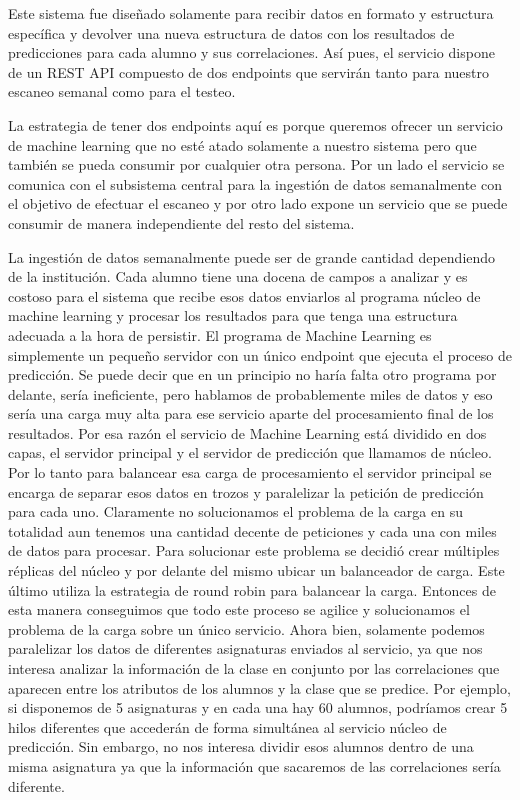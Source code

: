 Este sistema fue diseñado solamente para recibir datos en formato y
estructura específica y devolver una nueva estructura de datos con los
resultados de predicciones para cada alumno y sus correlaciones. Así
pues, el servicio dispone de un REST API compuesto de dos endpoints
que servirán tanto para nuestro escaneo semanal como para el testeo.

La estrategia de tener dos endpoints aquí es porque queremos ofrecer
un servicio de machine learning que no esté atado solamente a nuestro
sistema pero que también se pueda consumir por cualquier otra
persona. Por un lado el servicio se comunica con el subsistema central
para la ingestión de datos semanalmente con el objetivo de efectuar el
escaneo y por otro lado expone un servicio que se puede consumir de
manera independiente del resto del sistema.

La ingestión de datos semanalmente puede ser de grande cantidad
dependiendo de la institución. Cada alumno tiene una docena de campos
a analizar y es costoso para el sistema que recibe esos datos
enviarlos al programa núcleo de machine learning y procesar los
resultados para que tenga una estructura adecuada a la hora de
persistir. El programa de Machine Learning es simplemente un pequeño
servidor con un único endpoint que ejecuta el proceso de
predicción. Se puede decir que en un principio no haría falta otro
programa por delante, sería ineficiente, pero hablamos de
probablemente miles de datos y eso sería una carga muy alta para ese
servicio aparte del procesamiento final de los resultados. Por esa
razón el servicio de Machine Learning está dividido en dos capas, el
servidor principal y el servidor de predicción que llamamos de
núcleo. Por lo tanto para balancear esa carga de procesamiento el
servidor principal se encarga de separar esos datos en trozos y
paralelizar la petición de predicción para cada uno. Claramente no
solucionamos el problema de la carga en su totalidad aun tenemos una
cantidad decente de peticiones y cada una con miles de datos para
procesar. Para solucionar este problema se decidió crear múltiples
réplicas del núcleo y por delante del mismo ubicar un balanceador de
carga. Este último utiliza la estrategia de round robin para balancear
la carga. Entonces de esta manera conseguimos que todo este proceso se
agilice y solucionamos el problema de la carga sobre un único
servicio.  Ahora bien, solamente podemos paralelizar los datos de
diferentes asignaturas enviados al servicio, ya que nos interesa
analizar la información de la clase en conjunto por las correlaciones
que aparecen entre los atributos de los alumnos y la clase que se
predice. Por ejemplo, si disponemos de 5 asignaturas y en cada una hay
60 alumnos, podríamos crear 5 hilos diferentes que accederán de forma
simultánea al servicio núcleo de predicción. Sin embargo, no nos
interesa dividir esos alumnos dentro de una misma asignatura ya que la
información que sacaremos de las correlaciones sería diferente.

